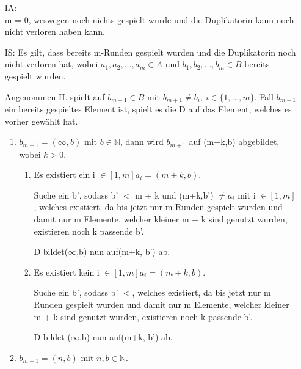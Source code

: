 \documentclass[a4paper,10pt]{article}
\begin{document}
	\begin{enumerate}

	\item[IA:] ~\\
		m = 0, weswegen noch nichts gespielt wurde und die Duplikatorin kann noch nicht verloren haben kann.
		
	\item[IS:]
		Es gilt, dass bereits m-Runden gespielt wurden und die Duplikatorin noch nicht verloren hat, wobei
		$a_1,a_2,...,a_m \in A$ und $b_1,b_2,...,b_m \in B$ bereits gespielt wurden.
		
		Angenommen H. spielt auf $b_{m+1} \in B$ mit $b_{m+1} \neq b_i,~ i \in \{1,...,m\}$. Fall $b_{m+1}$ ein bereits gespieltes Element ist, 	
		spielt es die D auf das Element, welches es vorher gewählt hat.
		
		\item[]
		\begin{enumerate}
			\item
				$b_{m+1} = (\infty, b)$ mit $b \in \mathbb{N}$, dann wird $b_{m+1}$ auf (m+k,b) abgebildet, wobei $k > 0$.
				\begin{enumerate}
					\item	
						Es existiert ein i $\in [1,m] a_i = (m+k,b)$. 
						
						Suche ein b', sodass b' $<$ m + k und (m+k,b') $\neq a_i$ mit i $\in [1,m]$ , welches existiert, da bis 
						jetzt nur m Runden gespielt wurden und damit nur m Elemente, welcher kleiner m + k
						sind genutzt wurden, existieren noch k passende b'. 
						
						D bildet($\infty$,b) nun auf(m+k, b') ab.
						
					\item 
						Es existiert kein i $\in [1,m] a_i = (m+k,b)$. 
						
						Suche ein b', sodass b' $<$, welches existiert, da bis 
						jetzt nur m Runden gespielt wurden und damit nur m Elemente, welcher kleiner m + k
						sind genutzt wurden, existieren noch k passende b'. 
						
						D bildet ($\infty$,b) nun auf(m+k, b') ab.
				\end{enumerate}
			\item
				$b_{m+1} = (n, b)$ mit $n,b \in \mathbb{N}$.
				

\end{enumerate}
\end{enumerate}
\end{document}
